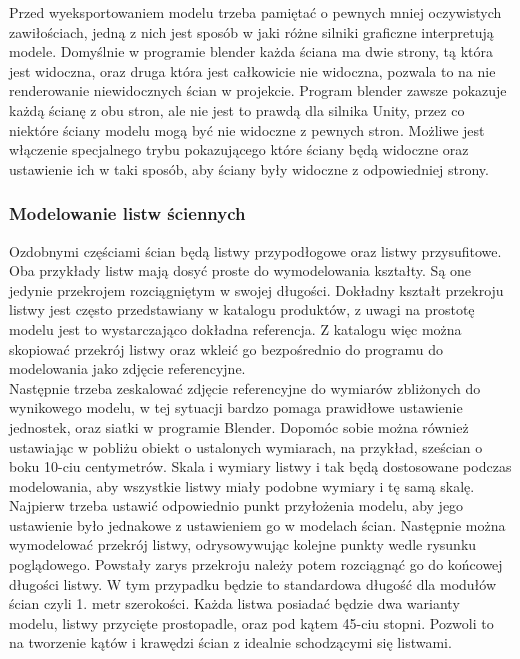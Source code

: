 \documentclass{article} %
\begin{document}
            Przed wyeksportowaniem modelu trzeba pamiętać o pewnych mniej oczywistych zawiłościach, jedną z nich jest sposób w jaki różne silniki graficzne interpretują modele. Domyślnie w programie blender każda ściana ma dwie strony, tą która jest widoczna, oraz druga która jest całkowicie nie widoczna, pozwala to na nie renderowanie niewidocznych ścian w projekcie. Program blender zawsze pokazuje każdą ścianę z obu stron, ale nie jest to prawdą dla silnika Unity, przez co niektóre ściany modelu mogą być nie widoczne z pewnych stron. Możliwe jest włączenie specjalnego trybu pokazującego które ściany będą widoczne oraz ustawienie ich w taki sposób, aby ściany były widoczne z odpowiedniej strony.
            \\
            
        \subsubsection{Modelowanie listw ściennych}
            Ozdobnymi częściami ścian będą listwy przypodłogowe oraz listwy przysufitowe. Oba przykłady listw mają dosyć proste do wymodelowania kształty. Są one jedynie przekrojem rozciągniętym w swojej długości. Dokładny kształt przekroju listwy jest często przedstawiany w katalogu produktów, z uwagi na prostotę modelu jest to wystarczająco dokładna referencja. Z katalogu więc można skopiować przekrój listwy oraz wkleić go bezpośrednio do programu do modelowania jako zdjęcie referencyjne.
            \\
            
            Następnie trzeba zeskalować zdjęcie referencyjne do wymiarów zbliżonych do wynikowego modelu, w tej sytuacji bardzo pomaga prawidłowe ustawienie jednostek, oraz siatki w programie Blender. Dopomóc sobie można również ustawiając w pobliżu obiekt o ustalonych wymiarach, na przykład, sześcian o boku 10-ciu centymetrów. Skala i wymiary listwy i tak będą dostosowane podczas modelowania, aby wszystkie listwy miały podobne wymiary i tę samą skalę. 
            \\
            
            Najpierw trzeba ustawić odpowiednio punkt przyłożenia modelu, aby jego ustawienie było jednakowe z ustawieniem go w modelach ścian. Następnie można wymodelować przekrój listwy, odrysowywując kolejne punkty wedle rysunku poglądowego. Powstały zarys przekroju należy potem rozciągnąć go do końcowej długości listwy. W tym przypadku będzie to standardowa długość dla modułów ścian czyli 1. metr szerokości. Każda listwa posiadać będzie dwa warianty modelu, listwy przycięte prostopadle, oraz pod kątem 45-ciu stopni. Pozwoli to na tworzenie kątów i krawędzi ścian z idealnie schodzącymi się listwami.
            \\
            
\end{document}
